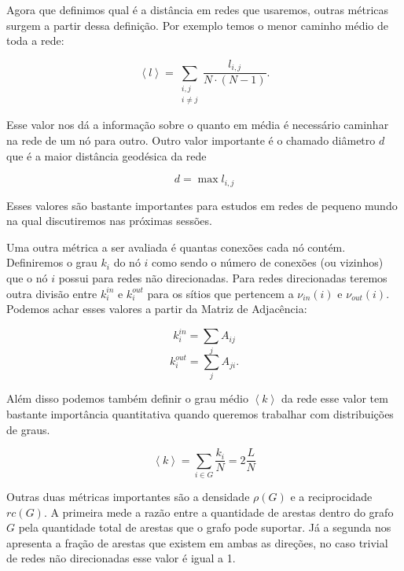\documentclass[12pt]{abnt-fisica11}%
\begin{document}
Agora que definimos qual é a distância em redes que usaremos, outras métricas surgem a partir dessa definição. Por exemplo temos o menor caminho médio de toda a rede:

\begin{equation}
  \left\langle l \right\rangle  = \sum_{\substack{i,j \\ i\neq j}} \frac{l_{i,j}}{N\cdot(N-1)}.
\end{equation}

Esse valor nos dá a informação sobre o quanto em média é necessário caminhar na rede de um nó para outro. Outro valor importante é o chamado diâmetro $d$ que é a maior distância geodésica da rede

\begin{equation}
  d = \max l_{i,j}
\end{equation}

Esses valores são bastante importantes para estudos em redes de pequeno mundo \cite{Kleinberg} na qual discutiremos nas próximas sessões.

Uma outra métrica a ser avaliada é quantas conexões cada nó contém. Definiremos o grau $k_i$ do nó $i$ como sendo o número de conexões (ou vizinhos) que o nó $i$ possui para redes não direcionadas. Para redes direcionadas teremos outra divisão entre $k^{in}_i$ e $k^{out}_i$ para os sítios que pertencem a $\nu_{in}(i)$ e $\nu_{out}(i)$. Podemos achar esses valores a partir da Matriz de Adjacência:

\begin{multicols}{2}
  \begin{equation*}
    k^{in}_i = \sum_{j} A_{ij}
  \end{equation*}
  \break
  \begin{equation}
    k^{out}_i = \sum_{j} A_{ji}.
  \end{equation}
\end{multicols}

Além disso podemos também definir o grau médio $\left\langle k \right\rangle$ da rede esse valor tem bastante importância quantitativa quando queremos trabalhar com distribuições de graus.

\begin{equation}
  \left\langle k \right\rangle = \sum_{i \in G}\frac{k_i}{N} = 2\frac{L}{N}
  \label{grau_tamanho}
\end{equation}

Outras duas métricas importantes são a densidade $\rho(G)$ e a reciprocidade $rc(G)$. A primeira mede a razão entre a quantidade de arestas dentro do grafo $G$ pela quantidade total de arestas que o grafo pode suportar. Já a segunda nos apresenta a fração de arestas que existem em ambas as direções, no caso trivial de redes não direcionadas esse valor é igual a 1.
\end{document}
